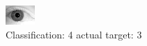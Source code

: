 \begin{figure}[h!]
\begin{center}
\includegraphics[width=0.60\columnwidth]{figures/ID2138_class_4_target_3.png}
\end{center}
\caption{ Classification: 4 actual target: 3}
\label{fig:ID2138_class_4_target_3}
\end{figure}
